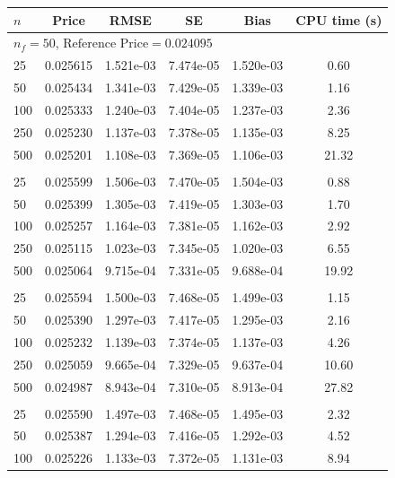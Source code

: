 \begin{table}[tph]
  \centering
  \begin{tabular}{lccccc}
    \hline\hline
    $n$ & Price & RMSE & SE & Bias & CPU time (s) \\
    \hline
    \multicolumn{6}{l}{$n_f = 50$, $\text{Reference Price} = 0.024095$} \\
      25 & 0.025615 & 1.521e-03 & 7.474e-05 & 1.520e-03 & 0.60 \\
      50 & 0.025434 & 1.341e-03 & 7.429e-05 & 1.339e-03 & 1.16 \\
     100 & 0.025333 & 1.240e-03 & 7.404e-05 & 1.237e-03 & 2.36 \\
     250 & 0.025230 & 1.137e-03 & 7.378e-05 & 1.135e-03 & 8.25 \\
     500 & 0.025201 & 1.108e-03 & 7.369e-05 & 1.106e-03 & 21.32 \\
    \addlinespace
    \multicolumn{6}{l}{$n_f = 100$, $\text{Reference Price} = 0.024095$} \\
      25 & 0.025599 & 1.506e-03 & 7.470e-05 & 1.504e-03 & 0.88 \\
      50 & 0.025399 & 1.305e-03 & 7.419e-05 & 1.303e-03 & 1.70 \\
     100 & 0.025257 & 1.164e-03 & 7.381e-05 & 1.162e-03 & 2.92 \\
     250 & 0.025115 & 1.023e-03 & 7.345e-05 & 1.020e-03 & 6.55 \\
     500 & 0.025064 & 9.715e-04 & 7.331e-05 & 9.688e-04 & 19.92 \\
    \addlinespace
    \multicolumn{6}{l}{$n_f = 200$, $\text{Reference Price} = 0.024095$} \\
      25 & 0.025594 & 1.500e-03 & 7.468e-05 & 1.499e-03 & 1.15 \\
      50 & 0.025390 & 1.297e-03 & 7.417e-05 & 1.295e-03 & 2.16 \\
     100 & 0.025232 & 1.139e-03 & 7.374e-05 & 1.137e-03 & 4.26 \\
     250 & 0.025059 & 9.665e-04 & 7.329e-05 & 9.637e-04 & 10.60 \\
     500 & 0.024987 & 8.943e-04 & 7.310e-05 & 8.913e-04 & 27.82 \\
    \addlinespace
    \multicolumn{6}{l}{$n_f = 400$, $\text{Reference Price} = 0.024095$} \\
      25 & 0.025590 & 1.497e-03 & 7.468e-05 & 1.495e-03 & 2.32 \\
      50 & 0.025387 & 1.294e-03 & 7.416e-05 & 1.292e-03 & 4.52 \\
     100 & 0.025226 & 1.133e-03 & 7.372e-05 & 1.131e-03 & 8.94 \\

\end{tabular}
\end{table}
